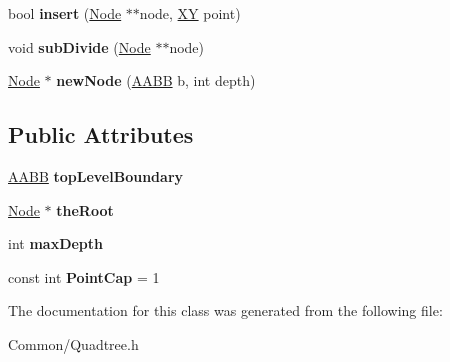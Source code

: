 \begin{DoxyCompactItemize}
\item 
\hypertarget{classbali_1_1_quad_tree_aae54db7cd4de5018fde8db2e892f6fa4}{bool {\bfseries insert} (\hyperlink{classbali_1_1_node}{Node} $\ast$$\ast$node, \hyperlink{classbali_1_1_x_y}{X\-Y} point)}\label{classbali_1_1_quad_tree_aae54db7cd4de5018fde8db2e892f6fa4}

\item 
\hypertarget{classbali_1_1_quad_tree_ad2b1833338947540b11d3dde95a4de0a}{void {\bfseries sub\-Divide} (\hyperlink{classbali_1_1_node}{Node} $\ast$$\ast$node)}\label{classbali_1_1_quad_tree_ad2b1833338947540b11d3dde95a4de0a}

\item 
\hypertarget{classbali_1_1_quad_tree_a2aee8324cbfdf23503c188266c8dfd79}{\hyperlink{classbali_1_1_node}{Node} $\ast$ {\bfseries new\-Node} (\hyperlink{classbali_1_1_a_a_b_b}{A\-A\-B\-B} b, int depth)}\label{classbali_1_1_quad_tree_a2aee8324cbfdf23503c188266c8dfd79}

\end{DoxyCompactItemize}
\subsection*{Public Attributes}
\begin{DoxyCompactItemize}
\item 
\hypertarget{classbali_1_1_quad_tree_acf5aa2f30fc9797130332c426dd4c588}{\hyperlink{classbali_1_1_a_a_b_b}{A\-A\-B\-B} {\bfseries top\-Level\-Boundary}}\label{classbali_1_1_quad_tree_acf5aa2f30fc9797130332c426dd4c588}

\item 
\hypertarget{classbali_1_1_quad_tree_a11812b48d9339d4509b8b274a5a65534}{\hyperlink{classbali_1_1_node}{Node} $\ast$ {\bfseries the\-Root}}\label{classbali_1_1_quad_tree_a11812b48d9339d4509b8b274a5a65534}

\item 
\hypertarget{classbali_1_1_quad_tree_a84c4b35f2d04a971f48f4d91a70300c8}{int {\bfseries max\-Depth}}\label{classbali_1_1_quad_tree_a84c4b35f2d04a971f48f4d91a70300c8}

\item 
\hypertarget{classbali_1_1_quad_tree_a2e38d3edd3d55792ab4ed6cbb941efd7}{const int {\bfseries Point\-Cap} = 1}\label{classbali_1_1_quad_tree_a2e38d3edd3d55792ab4ed6cbb941efd7}

\end{DoxyCompactItemize}


The documentation for this class was generated from the following file\-:\begin{DoxyCompactItemize}
\item 
Common/Quadtree.\-h\end{DoxyCompactItemize}
